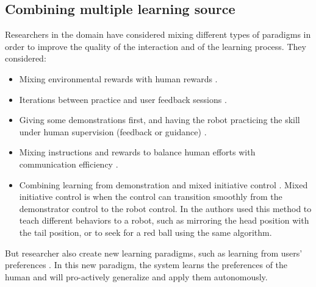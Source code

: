 \subsection{Combining multiple learning source}

Researchers in the domain have considered mixing different types of paradigms in order to improve the quality of the interaction and of the learning process. They considered:

\begin{itemize}

\item Mixing environmental rewards with human rewards \cite{knox2010combining,griffith2013policy,grave2013learning}.

\item Iterations between practice and user feedback sessions \cite{judah2010reinforcement}. 

\item Giving some demonstrations first, and having the robot practicing the skill under human supervision (feedback or guidance) \cite{nicolescu2003natural,pardowitz2007incremental}.

\item Mixing instructions and rewards to balance human efforts with communication efficiency \cite{pilarski2012between}.

\item Combining learning from demonstration and mixed initiative control \cite{grollman2007dogged}. Mixed initiative control is when the control can transition smoothly from the demonstrator control to the robot control. In \cite{grollman2007dogged} the authors used this method to teach different behaviors to a robot, such as mirroring the head position with the tail position, or to seek for a red ball using the same algorithm.

\end{itemize}

But researcher also create new learning paradigms, such as learning from users' preferences \cite{Mason2011,akrour2011preference}. In this new paradigm, the system learns the preferences of the human and will pro-actively generalize and apply them autonomously. 

